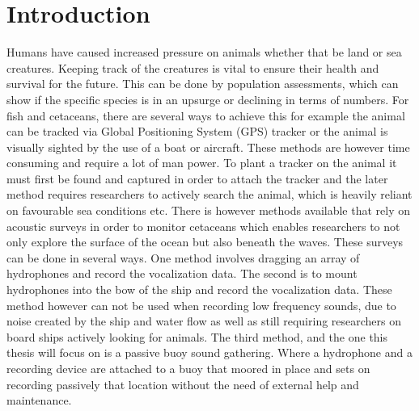 \chapter{Introduction\label{cha:introduction}}




Humans have caused increased pressure on animals whether that be land or sea creatures.
Keeping track of the creatures is vital to ensure their health and survival for the future.
This can be done by population assessments, which can show if the specific species is in an upsurge or declining in terms of numbers.
For fish and cetaceans, there are several ways to achieve this for example the animal can be tracked via Global Positioning System (GPS) tracker or the animal is visually sighted by the use of a boat or aircraft.
These methods are however time consuming and require a lot of man power.
To plant a tracker on the animal it must first be found and captured in order to attach the tracker and the later method requires researchers to actively search the animal, which is heavily reliant on favourable sea conditions etc.
There is however methods available that rely on acoustic surveys in order to monitor cetaceans which enables researchers to not only explore the surface of the ocean but also beneath the waves.
These surveys can be done in several ways.
One method involves dragging an array of hydrophones and record the vocalization data.
The second is to mount hydrophones into the bow of the ship and record the vocalization data.
These method however can not be used when recording low frequency sounds, due to noise created by the ship and water flow as well as still requiring researchers on board ships actively looking for animals.
The third method, and the one this thesis will focus on is a passive buoy sound gathering.
Where a hydrophone and a recording device are attached to a buoy that moored in place and sets on recording passively that location without the need of external help and maintenance.

